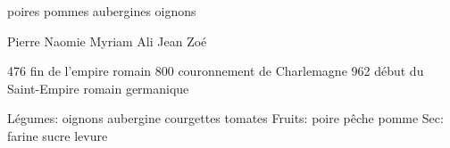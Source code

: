 \documentclass[12pt,a4paper]{article}
\begin{document}
poires  
pommes
aubergines
oignons

Pierre
Naomie
Myriam
Ali
Jean
Zoé 

476 fin de l'empire romain
800 couronnement de Charlemagne
962 début du Saint-Empire romain germanique

 Légumes: 
 	oignons
	aubergine
	courgettes
	tomates
 Fruits:
 	poire
	pêche
	pomme
 Sec:
 	farine
	sucre
	levure
\end{document}
